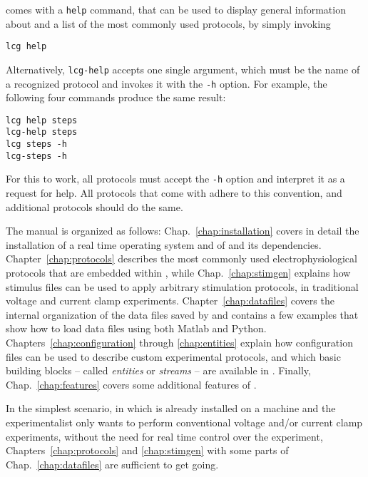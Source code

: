 \progname comes with a \verb+help+ command, that can be used to
display general information about \progname and a list of the most
commonly used protocols, by simply invoking
\begin{lstlisting}
lcg help
\end{lstlisting}
Alternatively, \verb+lcg-help+ accepts one single argument,
which must be the name of a recognized protocol and invokes it with
the \verb+-h+ option. For example, the following four commands
produce the same result:
\begin{lstlisting}
lcg help steps
lcg-help steps
lcg steps -h
lcg-steps -h
\end{lstlisting}
For this to work, all protocols must accept the \verb+-h+ option
and interpret it as a request for help. All protocols that come with
\progname adhere to this convention, and additional protocols should
do the same.

The manual is organized as follows: Chap.~\ref{chap:installation}
covers in detail the installation of a real time operating system and of
\progname and its dependencies. Chapter~\ref{chap:protocols} describes
the most commonly used electrophysiological protocols that are
embedded within \progname, while Chap.~\ref{chap:stimgen} explains how
stimulus files can be used to apply arbitrary stimulation protocols,
in traditional voltage and current clamp
experiments. Chapter~\ref{chap:datafiles} covers the internal
organization of the data files saved by \progname and contains a few
examples that show how to load \progname data files using both Matlab
and Python. Chapters~\ref{chap:configuration} through
\ref{chap:entities} explain how configuration files can be used to
describe custom experimental protocols, and which basic building blocks
-- called {\it entities} or {\it streams} -- are available in \progname.
Finally, Chap.~\ref{chap:features} covers some additional features of
\progname.

In the simplest scenario, in which \progname is already installed on a
machine and the experimentalist only wants to perform conventional
voltage and/or current clamp experiments, without the need for real
time control over the experiment, Chapters~\ref{chap:protocols} and
\ref{chap:stimgen} with some parts of Chap.~\ref{chap:datafiles} are
sufficient to get going.